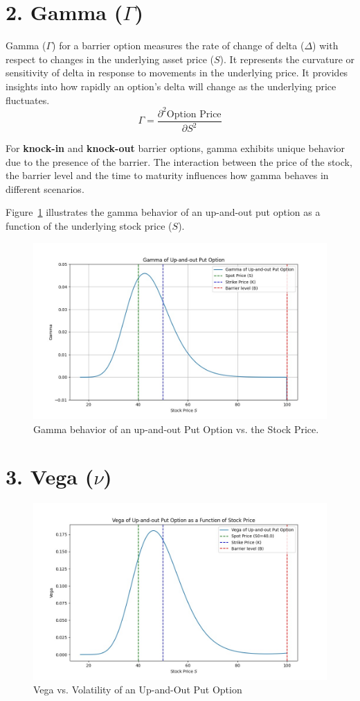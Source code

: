 \section*{2. Gamma (\(\Gamma\))}

Gamma (\(\Gamma\)) for a barrier option measures the rate of change of delta (\(\Delta\)) with respect to changes in the underlying asset price (\(S\)). It represents the curvature or sensitivity of delta in response to movements in the underlying price. It provides insights into how rapidly an option's delta will change as the underlying price fluctuates.
\[
\Gamma = \frac{\partial^2 \text{Option Price}}{\partial S^2}
\]

For \textbf{knock-in} and \textbf{knock-out} barrier options, gamma exhibits unique behavior due to the presence of the barrier. The interaction between the price of the stock, the barrier level and the time to maturity influences how gamma behaves in different scenarios.

Figure~\ref{fig:gamma_behavior} illustrates the gamma behavior of an up-and-out put option as a function of the underlying stock price (\(S\)). 

\begin{figure}[h]
    \centering
    \includegraphics[width=.65\linewidth]{content/images/gamma-upout.png}
    \caption{Gamma behavior of an up-and-out Put Option vs. the Stock Price.}
    \label{fig:gamma_behavior}
\end{figure}

\section*{3. Vega (\(\nu\))}

\begin{figure}[h]
    \centering
    \includegraphics[width=.65\linewidth]{content/images/vega_upout.png}
    \caption{Vega vs. Volatility of an Up-and-Out Put Option}
    \label{fig:vega_behavior}
\end{figure}

